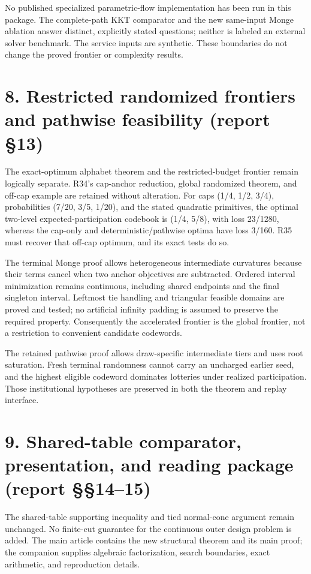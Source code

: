 \documentclass[11pt,letterpaper]{article}
\begin{document}
No published specialized parametric-flow implementation has been run in this package. The complete-path KKT comparator and the new same-input Monge ablation answer distinct, explicitly stated questions; neither is labeled an external solver benchmark. The service inputs are synthetic. These boundaries do not change the proved frontier or complexity results.


\section*{8. Restricted randomized frontiers and pathwise feasibility (report §13)}

The exact-optimum alphabet theorem and the restricted-budget frontier remain logically separate. R34's cap-anchor reduction, global randomized theorem, and off-cap example are retained without alteration. For caps (1/4, 1/2, 3/4), probabilities (7/20, 3/5, 1/20), and the stated quadratic primitives, the optimal two-level expected-participation codebook is (1/4, 5/8), with loss 23/1280, whereas the cap-only and deterministic/pathwise optima have loss 3/160. R35 must recover that off-cap optimum, and its exact tests do so.


The terminal Monge proof allows heterogeneous intermediate curvatures because their terms cancel when two anchor objectives are subtracted. Ordered interval minimization remains continuous, including shared endpoints and the final singleton interval. Leftmost tie handling and triangular feasible domains are proved and tested; no artificial infinity padding is assumed to preserve the required property. Consequently the accelerated frontier is the global frontier, not a restriction to convenient candidate codewords.


The retained pathwise proof allows draw-specific intermediate tiers and uses root saturation. Fresh terminal randomness cannot carry an uncharged earlier seed, and the highest eligible codeword dominates lotteries under realized participation. Those institutional hypotheses are preserved in both the theorem and replay interface.


\section*{9. Shared-table comparator, presentation, and reading package (report §§14--15)}

The shared-table supporting inequality and tied normal-cone argument remain unchanged. No finite-cut guarantee for the continuous outer design problem is added. The main article contains the new structural theorem and its main proof; the companion supplies algebraic factorization, search boundaries, exact arithmetic, and reproduction details.
\end{document}
